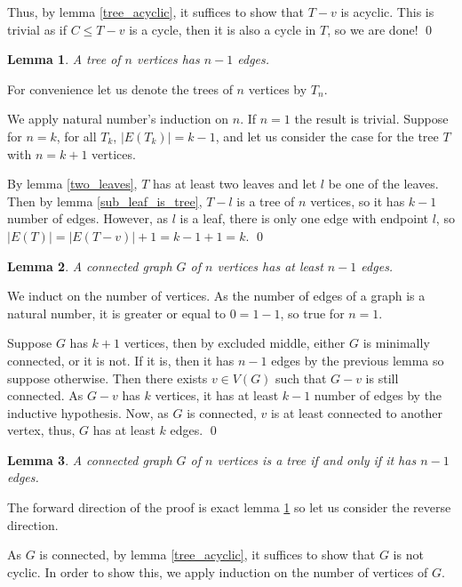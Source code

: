 \documentclass[
]{article}
\newtheorem{lemma}{Lemma}
\theoremstyle{definition}
\begin{document}
Thus, by lemma \ref{tree_acyclic}, it suffices to show that \(T - v\) is
acyclic. This is trivial as if \(C \le T - v\) is a cycle, then it is
also a cycle in \(T\), so we are done! \qed

\begin{lemma}\label{tree_edges}
  A tree of \(n\) vertices has \(n - 1\) edges.
\end{lemma}
\proof

For convenience let us denote the trees of \(n\) vertices by \(T_n\).

We apply natural number's induction on \(n\). If \(n = 1\) the result is
trivial. Suppose for \(n = k\), for all \(T_k\),
\(\left| E(T_k) \right| = k - 1\), and let us consider the case for the
tree \(T\) with \(n = k + 1\) vertices.

By lemma \ref{two_leaves}, \(T\) has at least two leaves and let \(l\)
be one of the leaves. Then by lemma \ref{sub_leaf_is_tree}, \(T - l\) is
a tree of \(n\) vertices, so it has \(k - 1\) number of edges. However,
as \(l\) is a leaf, there is only one edge with endpoint \(l\), so
\(\left| E(T) \right| = \left| E(T - v) \right| + 1 = k - 1 + 1 = k\).
\qed

\begin{lemma}
  A connected graph \(G\) of \(n\) vertices has at least \(n - 1\) edges.
\end{lemma}
\proof

We induct on the number of vertices. As the number of edges of a graph
is a natural number, it is greater or equal to \(0 = 1 - 1\), so true
for \(n = 1\).

Suppose \(G\) has \(k + 1\) vertices, then by excluded middle, either
\(G\) is minimally connected, or it is not. If it is, then it has
\(n - 1\) edges by the previous lemma so suppose otherwise. Then there
exists \(v \in V(G)\) such that \(G - v\) is still connected. As
\(G - v\) has \(k\) vertices, it has at least \(k - 1\) number of edges
by the inductive hypothesis. Now, as \(G\) is connected, \(v\) is at
least connected to another vertex, thus, \(G\) has at least \(k\) edges.
\qed

\begin{lemma}
  A connected graph \(G\) of \(n\) vertices is a tree if and only if it has 
  \(n - 1\) edges.
\end{lemma}
\proof

The forward direction of the proof is exact lemma \ref{tree_edges} so
let us consider the reverse direction.

As \(G\) is connected, by lemma \ref{tree_acyclic}, it suffices to show
that \(G\) is not cyclic. In order to show this, we apply induction on
the number of vertices of \(G\).
\end{document}
